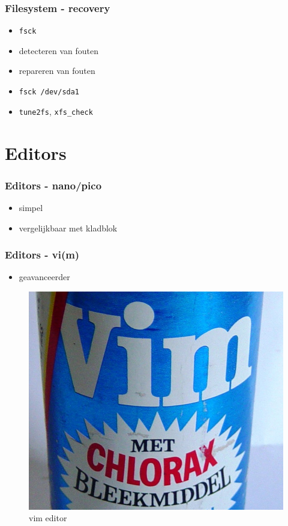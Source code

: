 \documentclass{beamer}
\begin{document}
\begin{frame}
  \frametitle{Filesystem - recovery}
  \begin{itemize}
  \item<1-> \texttt{fsck}
  \item<2-> detecteren van fouten
  \item<3-> repareren van fouten
  \item<4-> \texttt{fsck /dev/sda1}
  \item<5-> \texttt{tune2fs}, \texttt{xfs\_check}
  \end{itemize}
\end{frame}

\section{Editors}

\begin{frame}
  \frametitle{Editors - nano/pico}
  \begin{itemize}
  \item<1-> simpel
  \item<2-> vergelijkbaar met kladblok
  \end{itemize}
\end{frame}

\begin{frame}
  \frametitle{Editors - vi(m)}
  \begin{itemize}
  \item<1-> geavanceerder
  \end{itemize}
  \begin{figure}[H]
    \begin{center}
      \includegraphics[scale=0.2]{images/vimschoonmaak}
    \end{center}
    \caption{vim editor}
    \label{fig:editor_vim}
  \end{figure}
\end{frame}
\end{document}
